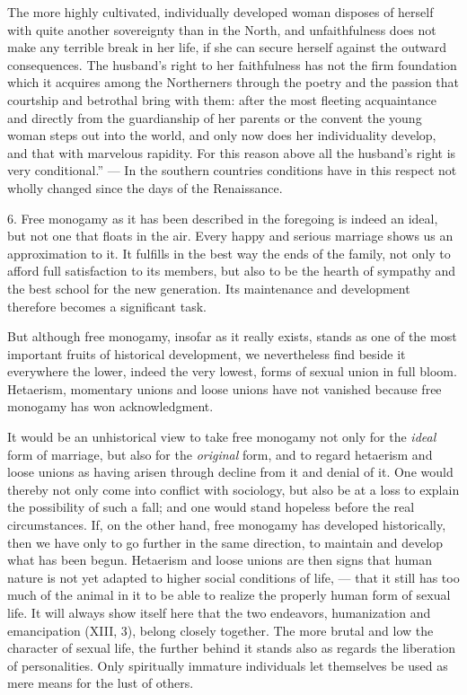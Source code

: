 \documentclass[12pt,a4paper,openany]{book}
\newcommand{\opage}[1]{\marginnote{\footnotesize\textit{[#1]}}}
\begin{document}
The more highly cultivated, individually developed woman disposes of herself with
quite another sovereignty than in the North, and unfaithfulness does not make any terrible break in her life, if she
can secure herself against the outward consequences. The husband's right to her faithfulness has not the firm foundation
which it acquires among the Northerners through the poetry and the passion that courtship and betrothal bring with
them: after the most fleeting acquaintance and directly from the guardianship of her parents or the convent the young
woman steps out into the world, and only now does her individuality develop, and that with marvelous rapidity. For this
reason above all the husband's right is very conditional.''%
--- In the southern
\opage{297}countries conditions have in this respect not wholly changed since the days of the Renaissance.

6. Free monogamy as it has been described in the foregoing is indeed an ideal, but not one that floats in the air. Every
happy and serious marriage shows us an approximation to it. It fulfills in the best way the ends of the family, not only
to afford full satisfaction to its members, but also to be the hearth of sympathy and the best school for the new
generation. Its maintenance and development therefore becomes a significant task.

But although free monogamy, insofar as it really exists, stands as one of the most important fruits of historical
development, we nevertheless find beside it everywhere the lower, indeed the very lowest, forms of sexual union in full
bloom. Hetaerism, momentary unions and loose unions have not vanished because free monogamy has won acknowledgment.

It would be an unhistorical view to take free monogamy not only for the \textit{ideal} form of marriage, but also for
the \textit{original} form, and to regard hetaerism and loose unions as having arisen through decline from it and denial
of it. One would thereby not only come into conflict with sociology, but also be at a loss to explain the possibility of
such a fall; and one would stand hopeless before the real circumstances. If, on the other hand, free monogamy has
developed historically, then we have only to go further in the same direction, to maintain and develop what has been
begun. Hetaerism and loose unions are then signs that human nature is not yet adapted to higher social conditions of
life, --- that it still has too much of the animal in it to be able to realize the properly human form of sexual life.
It will always show itself here that the two endeavors, humanization and emancipation (XIII, 3), belong closely
together. The more brutal and low the character of sexual life, the further behind it stands also as regards the
liberation of personalities. Only spiritually immature individuals let themselves be used as mere means for the lust of
others.
\end{document}
